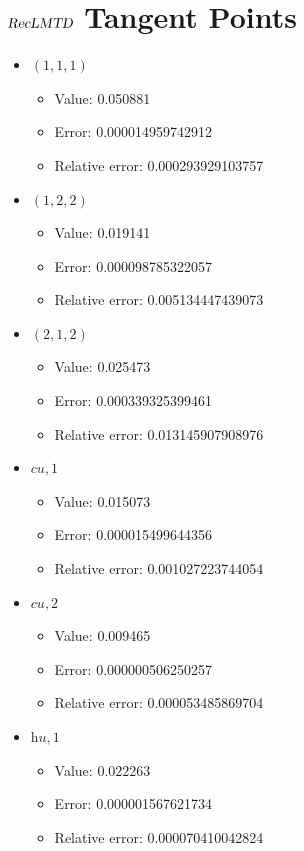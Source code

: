 \documentclass{article}%
\begin{document}
\section{$\textsl{RecLMTD}$ Tangent Points}%
\thispagestyle{plain}%
\begin{itemize}%
	\item $(1, 1, 1)$%
	\begin{itemize}%
		\item Value: 0.050881%
		\item Error: 0.000014959742912%
		\item Relative error: 0.000293929103757%
	\end{itemize}%
	\item $(1, 2, 2)$%
	\begin{itemize}%
		\item Value: 0.019141%
		\item Error: 0.000098785322057%
		\item Relative error: 0.005134447439073%
	\end{itemize}%
	\item $(2, 1, 2)$%
	\begin{itemize}%
		\item Value: 0.025473%
		\item Error: 0.000339325399461%
		\item Relative error: 0.013145907908976%
	\end{itemize}%
	\item $\textit{cu},1$%
	\begin{itemize}%
		\item Value: 0.015073%
		\item Error: 0.000015499644356%
		\item Relative error: 0.001027223744054%
	\end{itemize}%
	\item $\textit{cu},2$%
	\begin{itemize}%
		\item Value: 0.009465%
		\item Error: 0.000000506250257%
		\item Relative error: 0.000053485869704%
	\end{itemize}%
	\item $\textit{hu},1$%
	\begin{itemize}%
		\item Value: 0.022263%
		\item Error: 0.000001567621734%
		\item Relative error: 0.000070410042824%
	\end{itemize}%
\end{itemize}%
\end{document}
